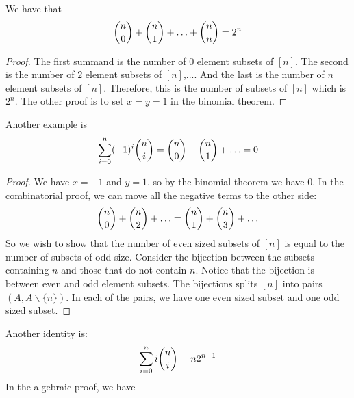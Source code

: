 \documentclass{report}
\begin{document}
\begin{examples}
    \begin{example}
        We have that 
            \begin{equation*}
                \dbinom{n}{0} + \dbinom{n}{1} + \ldots + \dbinom{n}{n} = 2^{n}
            \end{equation*}
        \begin{proof}
            The first summand is the number of $0$ element subsets of $[n]$. The second is the number of $2$ element subsets of $[n]$,.... And the last is the number of $n$ element subsets of $[n]$. Therefore, this is the number of subsets of $[n]$ which is $2^{n}$. The other proof is to set $x = y = 1$ in the binomial theorem.
        \end{proof}
    \end{example}
    \begin{example}
        Another example is
            \begin{equation*}
                \sum_{i = 0}^{n} (-1)^{i} \dbinom{n}{i} = \dbinom{n}{0} - \dbinom{n}{1} + \ldots = 0
            \end{equation*}
        \begin{proof}
            We have $x = -1$ and $y = 1$, so by the binomial theorem we have $0$. In the combinatorial proof, we can move all the negative terms to the other side:
                \begin{equation*}
                    \dbinom{n}{0} + \dbinom{n}{2} + \ldots = \dbinom{n}{1} + \dbinom{n}{3} + \ldots
                \end{equation*}
            So we wish to show that the number of even sized subsets of $[n]$ is equal to the number of subsets of odd size. Consider the bijection between the subsets containing $n$ and those that do not contain $n$. Notice that the bijection is between even and odd element subsets. The bijections splits $[n]$ into pairs $(A, A\backslash \{n\})$. In each of the pairs, we have one even sized subset and one odd sized subset.
        \end{proof}
    \end{example}
    \begin{example}
        Another identity is:
            \begin{equation*}
                \sum_{i = 0}^{n} i\dbinom{n}{i} = n2^{n - 1}
            \end{equation*}
        In the algebraic proof, we have
            \begin{equation*}

\end{equation*}
\end{example}
\end{examples}
\end{document}
